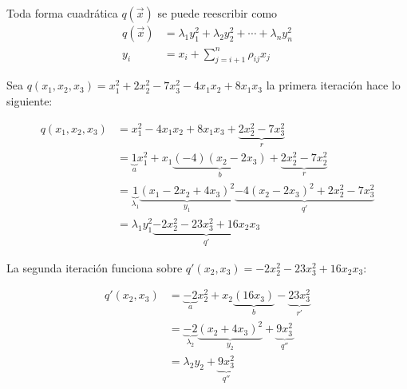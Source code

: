\begin{lemma}
Toda forma cuadrática $q\left(\overrightarrow{x}\right)$ se puede reescribir como
\begin{equation}
\begin{split}
q\left(\overrightarrow{x}\right) & =\lambda_{1}y_{1}^{2} + \lambda_{2}y_{2}^{2} + \cdots + \lambda_{n}y_{n}^{2}\\
y_{i} & = x_{i} + \sum_{j=i+1}^{n}\rho_{ij}x_{j}
\end{split}
\label{ecuacion:2.3}
\end{equation}
\label{lema:2.3}
\end{lemma}

\begin{example}

 Sea $q\left(x_{1}, x_{2}, x_{3}\right) = x_{1}^{2} + 2x_{2}^{2} - 7x_{3}^{2} - 4x_{1}x_{2} + 8x_{1}x_{3}$ la primera iteración hace lo siguiente:
 
 \begin{equation*}
\begin{split}
q\left(x_{1}, x_{2}, x_{3}\right) & = x_{1}^{2} - 4x_{1}x_{2} + 8x_{1}x_{3} +  \underbrace{2x_{2}^{2} - 7x_{3}^{2}}_{r}\\
 & = \underbrace{1}_{a}x_{1}^{2} + x_{1} \underbrace{\left(-4\right)\left(x_{2} - 2x_{3}\right)}_{b} + \underbrace{2x_{2}^{2} - 7x_{2}^{2}}_{r}\\
 & = \underbrace{1}_{\lambda_{1}} \underbrace{\left(x_{1} - 2x_{2} + 4x_{3}\right)^{2}}_{y_{1}} \underbrace{- 4\left(x_{2} - 2x_{3}\right)^{2} + 2x_{2}^{2} - 7x_{3}^{2}}_{q'}\\
 & = \lambda_{1}y_{1}^{2} \underbrace{- 2x_{2}^{2} - 23x_{3}^{2} + 16x_{2}x_{3}}_{q'}
\end{split}
\end{equation*}

La segunda iteración funciona sobre $q'\left(x_{2}, x_{3} \right) = -2x_{2}^{2} - 23x_{3}^{2} + 16x_{2}x_{3}$:

\begin{equation*}
\begin{split}
q'\left(x_{2}, x_{3}\right) & = \underbrace{-2}_{a}x_{2}^{2} + x_{2}\underbrace{\left(16x_{3}\right)}_{b} - \underbrace{23x_{3}^{2}}_{r'}\\
 & = \underbrace{-2}_{\lambda_{2}}\underbrace{\left(x_{2} + 4x_{3}\right)^{2}}_{y_{2}} + \underbrace{9x_{3}^{2}}_{q''}\\
 & = \lambda_{2}y_{2} + \underbrace{9x_{3}^{2}}_{q''}
\end{split}
\end{equation*}


\end{example}

